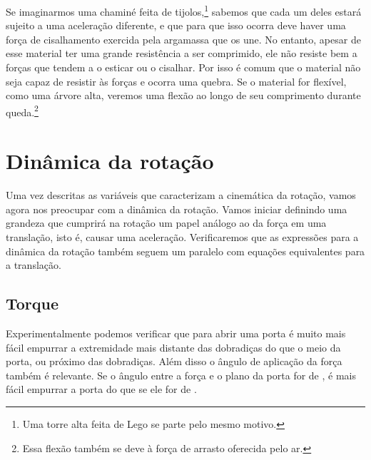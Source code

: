 Se imaginarmos uma chaminé feita de tijolos,\footnote{Uma torre alta feita de Lego se parte pelo mesmo motivo.} sabemos que cada um deles estará sujeito a uma aceleração diferente, e que para que isso ocorra deve haver uma força de cisalhamento exercida pela argamassa que os une. No entanto, apesar de esse material ter uma grande resistência a ser comprimido, ele não resiste bem a forças que tendem a o esticar ou o cisalhar. Por isso é comum que o material não seja capaz de resistir às forças e ocorra uma quebra. Se o material for flexível, como uma árvore alta, veremos uma flexão ao longo de seu comprimento durante queda.\footnote{Essa flexão também se deve à força de arrasto oferecida pelo ar.}

\section{Dinâmica da rotação}

Uma vez descritas as variáveis que caracterizam a cinemática da rotação, vamos agora nos preocupar com a dinâmica da rotação. Vamos iniciar definindo uma grandeza que cumprirá na rotação um papel análogo ao da força em uma translação, isto é, causar uma aceleração. Verificaremos que as expressões para a dinâmica da rotação também seguem um paralelo com equações equivalentes para a translação.

\subsection{Torque}

Experimentalmente podemos verificar que para abrir uma porta é muito mais fácil empurrar a extremidade mais distante das dobradiças do que o meio da porta, ou próximo das dobradiças. Além disso o ângulo de aplicação da força também é relevante. Se o ângulo entre a força e o plano da porta for de , é mais fácil empurrar a porta do que se ele for de .

